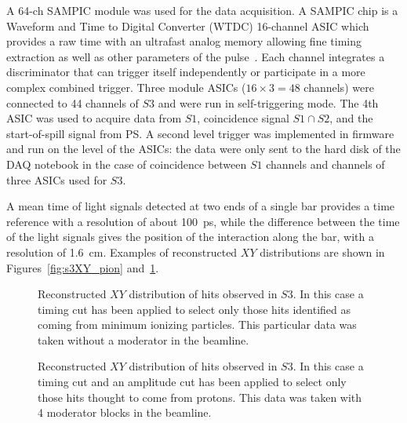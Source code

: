 A 64-ch SAMPIC  module was used for the data acquisition. A SAMPIC chip is a Waveform and Time to Digital Converter (WTDC) 16-channel ASIC which provides a raw time with an ultrafast analog memory allowing fine timing extraction as well as other parameters of the pulse~\cite{SAMPIC}. Each channel integrates a discriminator that can trigger itself independently or participate in a more complex combined trigger. 
Three module ASICs ($16\times3=48$ channels) were connected to 44 channels of $S3$ and were run in self-triggering mode. The 4th ASIC was used to acquire data from $S1$, coincidence signal $S1\cap S2$, and the start-of-spill signal from PS. A second level trigger was implemented in firmware and run on the level of the ASICs: the data were only sent to the hard disk of the DAQ notebook in the case of coincidence between $S1$ channels and channels of three ASICs used for $S3$.


A mean time of light signals detected at two ends of a single bar provides a time reference with a resolution of about 100~ps, while the difference between the time of the light signals gives the position of the interaction along the bar, with a resolution of 1.6~cm. Examples of reconstructed $XY$ distributions are shown in Figures~\ref{fig:s3XY_pion} and~\ref{fig:s3XY_proton}.



\begin{figure}[t]
	\begin{minipage}[t]{0.49\textwidth}
		\centering
		\begin{adjustbox}{max totalsize={\textwidth}{.5\textheight},center}
			
		\end{adjustbox}
		\caption{Reconstructed $XY$ distribution of hits observed in $S3$. In this case a timing cut has been applied to select only those hits identified as coming from minimum ionizing particles. This particular data was taken without a moderator in the beamline.}
		\label{fig:s3XY_pion}
	\end{minipage} 	
	\hfill
	\begin{minipage}[t]{0.49\textwidth}
		\centering
		\begin{adjustbox}{max totalsize={\textwidth}{.5\textheight},center}
			
		\end{adjustbox}
		\caption{Reconstructed $XY$ distribution of hits observed in $S3$. In this case a timing cut and an amplitude cut has been applied to select only those hits thought to come from protons. This data was taken with 4 moderator blocks in the beamline.}
		\label{fig:s3XY_proton}
	\end{minipage}
\end{figure}
  
